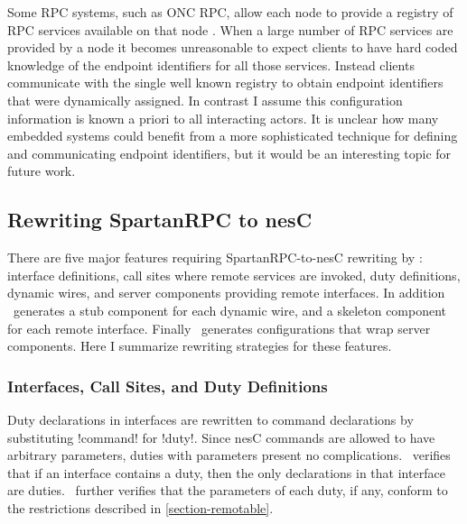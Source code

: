 Some RPC systems, such as ONC RPC, allow each node to provide a registry of RPC services
available on that node \cite{RFC-1833}. When a large number of RPC services are provided by a
node it becomes unreasonable to expect clients to have hard coded knowledge of the endpoint
identifiers for all those services. Instead clients communicate with the single well known
registry to obtain endpoint identifiers that were dynamically assigned. In contrast I assume
this configuration information is known a priori to all interacting actors. It is unclear how
many embedded systems could benefit from a more sophisticated technique for defining and
communicating endpoint identifiers, but it would be an interesting topic for future work.

\subsection{Rewriting SpartanRPC to nesC}

There are five major features requiring SpartanRPC-to-nesC rewriting by \Sprocket: interface
definitions, call sites where remote services are invoked, duty definitions, dynamic wires, and
server components providing remote interfaces. In addition \Sprocket\ generates a stub component
for each dynamic wire, and a skeleton component for each remote interface. Finally \Sprocket\
generates configurations that wrap server components. Here I summarize rewriting strategies for
these features.


\subsubsection{Interfaces, Call Sites, and Duty Definitions}

Duty declarations in interfaces are rewritten to command declarations by substituting !command!
for !duty!. Since nesC commands are allowed to have arbitrary parameters, duties with parameters
present no complications. \Sprocket\ verifies that if an interface contains a duty, then the
only declarations in that interface are duties. \Sprocket\ further verifies that the parameters
of each duty, if any, conform to the restrictions described in \autoref{section-remotable}.

